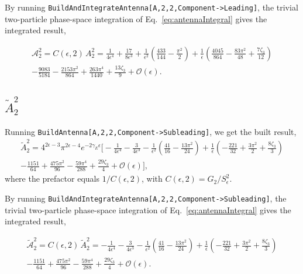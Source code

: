 \begin{sloppypar}
By running \texttt{BuildAndIntegrateAntenna[A,2,2,Component->Leading]}, the trivial two-particle
phase-space integration of Eq.~\eqref{eq:antennaIntegral} gives the integrated result,
\end{sloppypar}\noindent
\begin{equation}
    \begin{gathered}
        \mathcal A_2^2 = C(\epsilon,2)\,A_2^2 = \frac1{4\epsilon^4}+\frac{17}{8\epsilon^3}+\frac1{\epsilon^2}\!\left(\frac{433}{144}-\frac{\pi^2}2\right)+\frac1\epsilon\!\left(\frac{4045}{864}-\frac{83\pi^2}{48}+\frac{7\zeta_3}{12}\right)\\
        - \frac{9083}{5184}-\frac{2153\pi^2}{864}+\frac{263\pi^4}{1440}+\frac{13\zeta_3}{9}+\mathcal O(\epsilon).
    \end{gathered}
\end{equation}

\subsection{$\tilde A_2^2$}

Running \texttt{BuildAntenna[A,2,2,Component->Subleading]}, we get the built result,
\begin{equation}
    \begin{gathered}
        \tilde A_2^2 = 4^{2\epsilon-3}\pi^{2\epsilon-4}e^{-2\gamma_E\epsilon}\bigg[-\frac1{4\epsilon^4}-\frac{3}{4\epsilon^3}-\frac1{\epsilon^2}\!\left(\frac{41}{16}-\frac{13\pi^2}{24}\right) + \frac1\epsilon\!\left(-\frac{221}{32}+\frac{3\pi^2}{2}+\frac{8\zeta_3}{3}\right)\\
        -\frac{1151}{64}+\frac{475\pi^2}{96}-\frac{59\pi^4}{288}+\frac{29\zeta_3}{4}+\mathcal O(\epsilon)\bigg],
    \end{gathered}
\end{equation}
where the prefactor equals $1/C(\epsilon,2)$, with $C(\epsilon,2)=G_2/S_\epsilon^2$.

\begin{sloppypar}
By running \texttt{BuildAndIntegrateAntenna[A,2,2,Component->Subleading]}, the trivial two-particle
phase-space integration of Eq.~\eqref{eq:antennaIntegral} gives the integrated result,
\end{sloppypar}\noindent
\begin{equation}
    \begin{gathered}
        \tilde{\mathcal A}_2^2 = C(\epsilon,2)\,\tilde A_2^2 = -\frac1{4\epsilon^4}-\frac{3}{4\epsilon^3}-\frac1{\epsilon^2}\!\left(\frac{41}{16}-\frac{13\pi^2}{24}\right) + \frac1\epsilon\!\left(-\frac{221}{32}+\frac{3\pi^2}{2}+\frac{8\zeta_3}{3}\right)\\
        -\frac{1151}{64}+\frac{475\pi^2}{96}-\frac{59\pi^4}{288}+\frac{29\zeta_3}{4}+\mathcal O(\epsilon).
    \end{gathered}
\end{equation}

